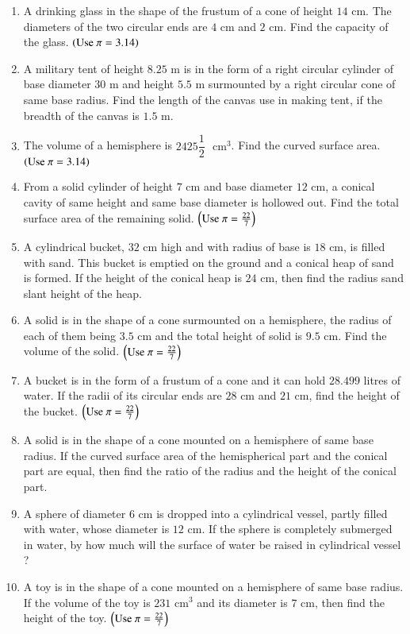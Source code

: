 \begin{enumerate}
\item A drinking glass in the shape of the frustum of a cone of height $14 \text{ cm}$. The diameters of the two circular ends are $4 \text{ cm}$ and $2 \text{ cm}$. Find the capacity of the glass.  $\left(\text{Use } \pi = 3.14\right)$ 

\item  A military tent of height $8.25 \text{ m}$ is in the form of a right circular cylinder of base diameter $30 \text{ m}$ and height $5.5 \text{ m}$ surmounted by a right circular cone of same base radius. Find the length of the canvas use in making tent, if the breadth of the canvas is $1.5 \text{ m}$. 

\item The volume of a hemisphere is $2425\dfrac{1}{2}$ $\text{ cm}^3$. Find the curved surface area.  $\left(\text{Use } \pi = 3.14\right)$ 

\item From a solid cylinder of height $7\text{ cm}$ and base diameter $12\text{ cm}$, a conical cavity of same height and same base diameter is hollowed out. Find the total surface area of the remaining solid. $\left(\text{Use } \pi = \frac{22}{7}\right)$ 

\item A cylindrical bucket, $32 \text{ cm}$ high and with radius of base is $18 \text{ cm}$, is filled with sand. This bucket is emptied on the ground and a conical heap of sand is formed. If the height of the conical heap is $24 \text{ cm}$, then find the radius sand slant height of the heap. 


\item A solid is in the shape of a cone surmounted on a hemisphere, the radius of each of them being $3.5\text{ cm}$ and the total height of solid is $9.5\text{ cm}$. Find the volume of the solid. $\left(\text{Use } \pi = \frac{22}{7}\right)$ 

\item A bucket is in the form of a frustum of a cone and it can hold $28.499$ litres of water. If the radii of its circular ends are $28\text{ cm}$ and $21\text{ cm}$, find the height of the bucket. $\left(\text{Use } \pi = \frac{22}{7}\right)$ 


\item A solid is in the shape of a cone mounted on a hemisphere of same base radius. If the curved surface area of the hemispherical part and the conical part are equal, then find the ratio of the radius and the height of the conical part. 

\item A sphere of diameter $6\text{ cm}$ is dropped into a cylindrical vessel, partly filled with water, whose diameter is $12\text{ cm}$. If the sphere is completely submerged in water, by how much will the surface of water be raised in cylindrical vessel ? 
\item A toy is in the shape of a cone mounted on a hemisphere of same base radius. If the volume of the toy is $231\text{ cm}^3$ and its diameter is $7\text{ cm}$, then find the height of the toy.  $\left(\text{Use } \pi = \frac{22}{7}\right)$ 


\end{enumerate}
